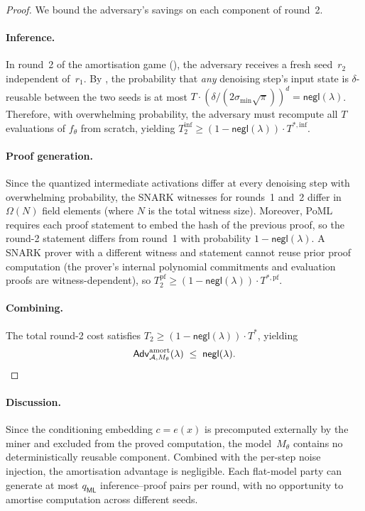 \documentclass[11pt]{article}
\newcommand{\negl}{\mathsf{negl}}
\newcommand{\calA}{\mathcal{A}}
\begin{document}
\begin{proof}
We bound the adversary's savings on each component of round~2.

\paragraph{Inference.}
In round~2 of the amortisation game (), the adversary receives a fresh seed~$r_2$ independent of~$r_1$. By , the probability that \emph{any} denoising step's input state is $\delta$-reusable between the two seeds is at most $T \cdot (\delta/(2\sigma_{\min}\sqrt{\pi}))^d = \negl(\lambda)$. Therefore, with overwhelming probability, the adversary must recompute all $T$ evaluations of $f_\theta$ from scratch, yielding $T_2^{\mathrm{inf}} \geq (1 - \negl(\lambda)) \cdot T^{*,\mathrm{inf}}$.

\paragraph{Proof generation.}
Since the quantized intermediate activations differ at every denoising step with overwhelming probability, the SNARK witnesses for rounds~1 and~2 differ in $\Omega(N)$ field elements (where $N$ is the total witness size). Moreover, PoML requires each proof statement to embed the hash of the previous proof, so the round-2 statement differs from round~1 with probability $1 - \negl(\lambda)$. A SNARK prover with a different witness and statement cannot reuse prior proof computation (the prover's internal polynomial commitments and evaluation proofs are witness-dependent), so $T_2^{\mathrm{pf}} \geq (1 - \negl(\lambda)) \cdot T^{*,\mathrm{pf}}$.

\paragraph{Combining.}
The total round-2 cost satisfies $T_2 \geq (1 - \negl(\lambda)) \cdot T^*$, yielding
\[
    \mathsf{Adv}^{\mathrm{amort}}_{\calA, M_\theta}(\lambda) \;\leq\; \negl(\lambda). \qedhere
\]
\end{proof}

\paragraph{Discussion.}
Since the conditioning embedding $c = e(x)$ is precomputed externally by the miner and excluded from the proved computation, the model~$M_\theta$ contains no deterministically reusable component. Combined with the per-step noise injection, the amortisation advantage is negligible. Each flat-model party can generate at most $q_\mathsf{ML}$ inference--proof pairs per round, with no opportunity to amortise computation across different seeds.
\end{document}
